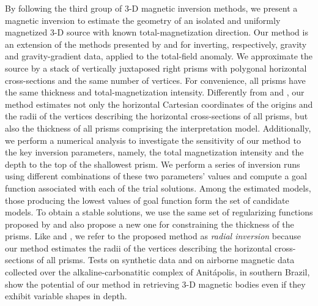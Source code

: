 By following the third group of 3-D magnetic inversion methods, 
we present a magnetic inversion to estimate the geometry of an isolated 
and uniformly magnetized 3-D source with known total-magnetization direction.
Our method is an extension of the methods presented 
by \cite{oliveirajr-etal2011} and \cite{oliveirajr-barbosa2013} for inverting, respectively, 
gravity and gravity-gradient data, applied to the total-field anomaly. 
We approximate the source by a stack of vertically juxtaposed 
right prisms with polygonal horizontal cross-sections and the same number of vertices.
For convenience, all prisms have the same thickness and total-magnetization 
intensity.
Differently from \cite{oliveirajr-etal2011} and \cite{oliveirajr-barbosa2013}, 
our method estimates not only the horizontal Cartesian coordinates of the origins and the radii of the vertices describing the horizontal cross-sections of all prisms, but also the thickness of all prisms comprising the interpretation model. Additionally, we perform a numerical analysis to investigate the sensitivity of our method to the key inversion parameters, namely, the total magnetization intensity and the depth to the top 
of the shallowest prism. 
We perform a series of inversion runs using different combinations of these two parameters' values and compute a goal function associated with each of the trial solutions.
Among the estimated models, those producing the 
lowest values of goal function form the set of candidate models.
To obtain a stable solutions, we use the same set of regularizing functions proposed by 
\cite{oliveirajr-etal2011} and also propose a new one for constraining the 
thickness of the prisms. 
Like \cite{oliveirajr-etal2011} and \cite{oliveirajr-barbosa2013}, we refer to the proposed method as \textit{radial inversion} because our method estimates the radii of the vertices describing the horizontal cross-sections of all prisms.
Tests on synthetic data and on airborne magnetic data collected over the alkaline-carbonatitic complex of Anit{\'a}polis, in southern Brazil, show the potential of our method in retrieving 3-D magnetic bodies even if they exhibit variable shapes in depth. 


